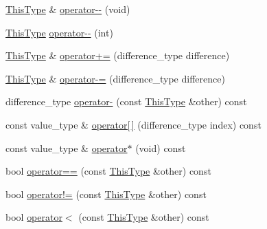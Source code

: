 \begin{DoxyCompactItemize}
\item 
\hyperlink{classvct_var_stride_n_array_const_iterator_ac729d2af265785aad6fdd43a70fbffdb}{This\-Type} \& \hyperlink{classvct_var_stride_n_array_const_iterator_aa82576a4daaae22d26b309dbc5e67d76}{operator-\/-\/} (void)
\item 
\hyperlink{classvct_var_stride_n_array_const_iterator_ac729d2af265785aad6fdd43a70fbffdb}{This\-Type} \hyperlink{classvct_var_stride_n_array_const_iterator_adb96c05b71bd85e13a0e8b7353a3567d}{operator-\/-\/} (int)
\item 
\hyperlink{classvct_var_stride_n_array_const_iterator_ac729d2af265785aad6fdd43a70fbffdb}{This\-Type} \& \hyperlink{classvct_var_stride_n_array_const_iterator_a4f205caf9e49786b984b4af918a11bce}{operator+=} (difference\-\_\-type difference)
\item 
\hyperlink{classvct_var_stride_n_array_const_iterator_ac729d2af265785aad6fdd43a70fbffdb}{This\-Type} \& \hyperlink{classvct_var_stride_n_array_const_iterator_a6818102765288c7d50027920a7471fa6}{operator-\/=} (difference\-\_\-type difference)
\item 
difference\-\_\-type \hyperlink{classvct_var_stride_n_array_const_iterator_a3136b61f02669a9fdf7187d94362bd1c}{operator-\/} (const \hyperlink{classvct_var_stride_n_array_const_iterator_ac729d2af265785aad6fdd43a70fbffdb}{This\-Type} \&other) const 
\item 
const value\-\_\-type \& \hyperlink{classvct_var_stride_n_array_const_iterator_aa87558431fe833c47b60c7a79fffabf0}{operator\mbox{[}$\,$\mbox{]}} (difference\-\_\-type index) const 
\item 
const value\-\_\-type \& \hyperlink{classvct_var_stride_n_array_const_iterator_aeee8ae1d7d4b697df11fb1bacfa03e09}{operator$\ast$} (void) const 
\item 
bool \hyperlink{classvct_var_stride_n_array_const_iterator_a489454a07a3dc7799a1bb785002ab24c}{operator==} (const \hyperlink{classvct_var_stride_n_array_const_iterator_ac729d2af265785aad6fdd43a70fbffdb}{This\-Type} \&other) const 
\item 
bool \hyperlink{classvct_var_stride_n_array_const_iterator_afeb1c9055eacc840d6fe8162f2f3ec9b}{operator!=} (const \hyperlink{classvct_var_stride_n_array_const_iterator_ac729d2af265785aad6fdd43a70fbffdb}{This\-Type} \&other) const 
\item 
bool \hyperlink{classvct_var_stride_n_array_const_iterator_ad1288a572b3b3ef669e8a76f750d0ea8}{operator$<$} (const \hyperlink{classvct_var_stride_n_array_const_iterator_ac729d2af265785aad6fdd43a70fbffdb}{This\-Type} \&other) const 

\end{DoxyCompactItemize}
